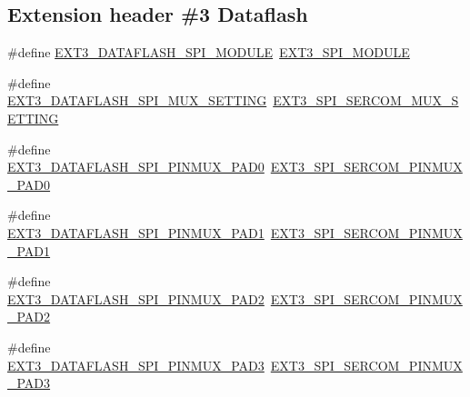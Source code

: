 \subsection*{Extension header \#3 Dataflash}
\begin{DoxyCompactItemize}
\item 
\#define \mbox{\hyperlink{group__samd21__xplained__pro__features__group_gaf02aebb8627c8319a574bb412fb7c5ff}{E\+X\+T3\+\_\+\+D\+A\+T\+A\+F\+L\+A\+S\+H\+\_\+\+S\+P\+I\+\_\+\+M\+O\+D\+U\+LE}}~\mbox{\hyperlink{group__samd21__xplained__pro__features__group_gabc0417beba6a839dc92dc896b683bdc9}{E\+X\+T3\+\_\+\+S\+P\+I\+\_\+\+M\+O\+D\+U\+LE}}
\item 
\#define \mbox{\hyperlink{group__samd21__xplained__pro__features__group_gaa6da49d31abd4b7fe6507af745aaea2d}{E\+X\+T3\+\_\+\+D\+A\+T\+A\+F\+L\+A\+S\+H\+\_\+\+S\+P\+I\+\_\+\+M\+U\+X\+\_\+\+S\+E\+T\+T\+I\+NG}}~\mbox{\hyperlink{group__samd21__xplained__pro__features__group_ga8d4d30895d2d69a41519f7bd6186fa42}{E\+X\+T3\+\_\+\+S\+P\+I\+\_\+\+S\+E\+R\+C\+O\+M\+\_\+\+M\+U\+X\+\_\+\+S\+E\+T\+T\+I\+NG}}
\item 
\#define \mbox{\hyperlink{group__samd21__xplained__pro__features__group_ga31b8b01cf921e37d105d145dc9d26681}{E\+X\+T3\+\_\+\+D\+A\+T\+A\+F\+L\+A\+S\+H\+\_\+\+S\+P\+I\+\_\+\+P\+I\+N\+M\+U\+X\+\_\+\+P\+A\+D0}}~\mbox{\hyperlink{group__samd21__xplained__pro__features__group_gad84ea44cf2afd41b5ba4fb60de91eb09}{E\+X\+T3\+\_\+\+S\+P\+I\+\_\+\+S\+E\+R\+C\+O\+M\+\_\+\+P\+I\+N\+M\+U\+X\+\_\+\+P\+A\+D0}}
\item 
\#define \mbox{\hyperlink{group__samd21__xplained__pro__features__group_ga2a574fe83a1e8e4fe2e8dfbf428a400d}{E\+X\+T3\+\_\+\+D\+A\+T\+A\+F\+L\+A\+S\+H\+\_\+\+S\+P\+I\+\_\+\+P\+I\+N\+M\+U\+X\+\_\+\+P\+A\+D1}}~\mbox{\hyperlink{group__samd21__xplained__pro__features__group_gae4cdf177fe002739bf0c0eb28ee02f7b}{E\+X\+T3\+\_\+\+S\+P\+I\+\_\+\+S\+E\+R\+C\+O\+M\+\_\+\+P\+I\+N\+M\+U\+X\+\_\+\+P\+A\+D1}}
\item 
\#define \mbox{\hyperlink{group__samd21__xplained__pro__features__group_ga86aed68cf1df48cd16df99f7be1d713e}{E\+X\+T3\+\_\+\+D\+A\+T\+A\+F\+L\+A\+S\+H\+\_\+\+S\+P\+I\+\_\+\+P\+I\+N\+M\+U\+X\+\_\+\+P\+A\+D2}}~\mbox{\hyperlink{group__samd21__xplained__pro__features__group_ga725cf7f9cbc5231e0bdbda235551d782}{E\+X\+T3\+\_\+\+S\+P\+I\+\_\+\+S\+E\+R\+C\+O\+M\+\_\+\+P\+I\+N\+M\+U\+X\+\_\+\+P\+A\+D2}}
\item 
\#define \mbox{\hyperlink{group__samd21__xplained__pro__features__group_ga49a072ec7379ff4c4bfce2b420c0431a}{E\+X\+T3\+\_\+\+D\+A\+T\+A\+F\+L\+A\+S\+H\+\_\+\+S\+P\+I\+\_\+\+P\+I\+N\+M\+U\+X\+\_\+\+P\+A\+D3}}~\mbox{\hyperlink{group__samd21__xplained__pro__features__group_ga84f1a1f8499cfa151898410c2dcf388c}{E\+X\+T3\+\_\+\+S\+P\+I\+\_\+\+S\+E\+R\+C\+O\+M\+\_\+\+P\+I\+N\+M\+U\+X\+\_\+\+P\+A\+D3}}
\end{DoxyCompactItemize}
